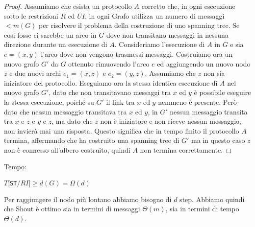 \begin{proof}
    Assumiamo che esista un protocollo $A$ corretto che, in ogni esecuzione
    sotto le restrizioni $R$ ed $UI$, in ogni Grafo utilizza un numero di
    messaggi $<m(G)$ per risolvere il problema della costruzione di uno spanning
    tree. Se cosi fosse ci sarebbe un arco in $G$ dove non transitano messaggi
    in nessuna direzione durante un esecuzione di $A$. Consideriamo l'esecuzione
    di $A$ in $G$ e sia $e=(x,y)$ l'arco dove non vengono trasmessi messaggi.
    Costruiamo ora un nuovo grafo $G'$ da $G$ ottenuto rimuovendo l'arco $e$ ed
    aggiungendo un nuovo nodo $z$ e due nuovi archi $e_1=(x,z)$ e $e_2=(y,z)$.
    Assumiamo che $z$ non sia iniziatore del protocollo. Eseguiamo ora la stessa
    identica esecuzione di $A$ nel nuovo grafo $G'$, dato che non transitavano
    messaggi tra $x$ ed $y$ è possibile eseguire la stessa esecuzione, poiché su
    $G'$ il link tra $x$ ed $y$ nemmeno è presente. Però dato che nessun
    messaggio transitava tra $x$ ed $y$, in $G'$ nessun messaggio transita tra
    $x$ e $z$ e $y$ e $z$, ma dato che $z$ non è iniziatore e non riceve nessun
    messaggio, non invierà mai una risposta. Questo significa che in tempo
    finito il protocollo $A$ termina, affermando che ha costruito una spanning
    tree di $G'$ ma in questo caso $z$ non è connesso all'albero costruito, quindi $A$
    non termina correttamente.
\end{proof}

\underline{Tempo:}
\begin{center}
    $T[$\texttt{ST}$/RI] \geq d(G) = \Omega(d)$
\end{center}
Per raggiungere il nodo più lontano abbiamo bisogno di $d$ step. Abbiamo quindi
che Shout è ottimo sia in termini di messaggi $\Theta(m)$, sia in termini di
tempo $\Theta(d)$.

